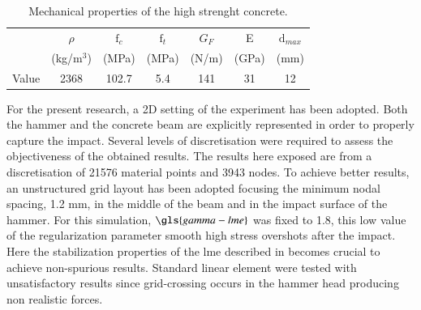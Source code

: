 \documentclass[preprint,12pt,a4paper]{elsarticle}
\begin{document}
\begin{table}
  \centering
  \begin{tabular}[]{c c c c c c c}
    \hline
      &   $\rho$   & $\text{f}_c$ & $\text{f}_t$ & $G_F$ &   E   & $\text{d}_{max}$ \\
      & (kg/m$^3$) &     (MPa)    &     (MPa)    & (N/m) & (GPa) & (mm) \\
    \hline
Value &    2368    &     102.7    &      5.4     &  141  &   31  &  12 \\
    \hline
  \end{tabular}
  \caption[Mechanical properties of thje concrete]{Mechanical
    properties of the high strenght concrete.}
  \label{tab:concrete-properties}
\end{table}
For the present research, a 2D setting of the experiment has been
adopted. Both the hammer and the concrete beam are explicitly
represented in order to properly capture the impact. Several levels of
discretisation were required to assess the objectiveness of the
obtained results. The results here exposed are from a discretisation
of 21576 material points and 3943 nodes. To achieve better results, an
unstructured grid layout has been adopted focusing the minimum nodal
spacing, 1.2 mm, in the middle of the beam and in the impact surface
of the hammer. For this simulation, $\gls{gamma-lme}$ was fixed to
1.8, this low value of the regularization parameter smooth high stress
overshots after the impact. Here the stabilization properties of the \acrshort{lme}
described in \cite{Molinos2020} becomes crucial to achieve
non-spurious results. Standard linear element were tested
with unsatisfactory results since grid-crossing occurs in the hammer
head producing non realistic forces.\\
\end{document}
